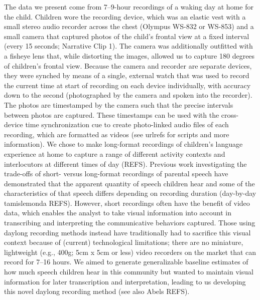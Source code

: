 \documentclass[floatsintext,man]{apa6}
\theoremstyle{definition}
\theoremstyle{definition}
\theoremstyle{definition}
\theoremstyle{remark}
\begin{document}
The data we present come from 7--9-hour recordings of a waking day at
home for the child. Children wore the recording device, which was an
elastic vest with a small stereo audio recorder across the chest
(Olympus WS-832 or WS-853) and a small camera that captured photos of
the child's frontal view at a fixed interval (every 15 seconds;
Narrative Clip 1). The camera was additionally outfitted with a fisheye
lens that, while distorting the images, allowed us to capture 180
degrees of children's frontal view. Because the camera and recorder are
separate devices, they were synched by means of a single, external watch
that was used to record the current time at start of recording on each
device individually, with accuracy down to the second (photographed by
the camera and spoken into the recorder). The photos are timestamped by
the camera such that the precise intervals between photos are captured.
These timestamps can be used with the cross-device time synchronization
cue to create photo-linked audio files of each recording, which are
formatted as videos (see urlrefs for scripts and more information). We
chose to make long-format recordings of children's language experience
at home to capture a range of different activity contexts and
interlocutors at different times of day (REFS). Previous work
investigating the trade-offs of short- versus long-format recordings of
parental speech have demonstrated that the apparent quantity of speech
children hear and some of the characteristics of that speech differs
depending on recording duration (day-by-day tamislemonda REFS). However,
short recordings often have the benefit of video data, which enables the
analyst to take visual information into account in transcribing and
interpreting the communicative behaviors captured. Those using daylong
recording methods instead have traditionally had to sacrifice this
visual context because of (current) technological limitations; there are
no miniature, lightweight (e.g., 400g; 5cm x 5cm or less) video
recorders on the market that can record for 7--16 hours. We aimed to
generate generalizable baseline estimates of how much speech children
hear in this community but wanted to maintain visual information for
later transcription and interpretation, leading to us developing this
novel daylong recording method (see also Abels REFS).
\end{document}
